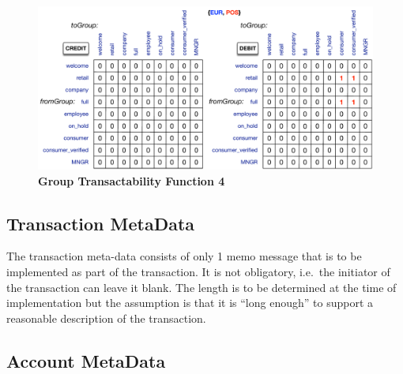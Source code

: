 \begin{figure}[H]
\centering
\includegraphics[width=17cm]{Figures/GTF4}
\caption{\small\textbf{Group Transactability Function 4}}
\label{fig:GTF4}
\end{figure}


\subsection{Transaction MetaData}

The transaction meta-data consists of only 1 memo message that is to be implemented as part of the transaction. It is not obligatory, i.e.\ the initiator of the transaction can leave it blank. The length is to be determined at the time of implementation but the assumption is that it is ``long enough'' to support a reasonable description of the transaction.


\subsection{Account MetaData}


